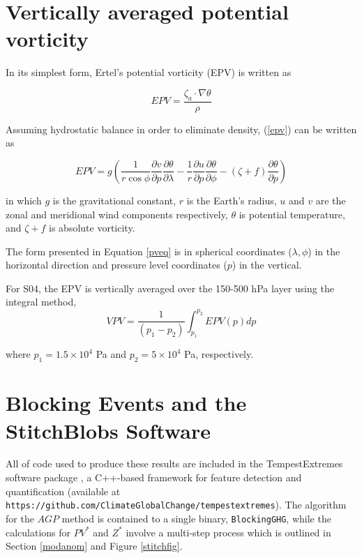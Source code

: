\documentclass[smallextended]{svjour3}       %
\numberwithin{equation}{section}
\begin{document}
\begin{appendices}

\section{Vertically averaged potential vorticity}\label{vpveq}

In its simplest form, Ertel's potential vorticity (EPV) is written as

\begin{equation}
EPV = \frac{\zeta_a\cdot \nabla \theta}{\rho}\label{epv}
\end{equation}

\noindent
Assuming hydrostatic balance in order to eliminate density, (\ref{epv}) can be written as 

\begin{equation}
  EPV=g\left(\frac{1}{r\cos\phi}\frac{\partial v}{\partial p}\frac{\partial \theta}{\partial \lambda}-\frac{1}{r}\frac{\partial u}{\partial p}\frac{\partial \theta}{\partial \phi}-(\zeta+f)\frac{\partial \theta}{\partial p}\right)\label{pveq}
\end{equation}

\noindent
in which $g$ is the gravitational constant, $r$ is the Earth's radius, $u$ and $v$ are the zonal and meridional wind components respectively, $\theta$ is potential temperature, and $\zeta + f$ is absolute vorticity.


The form presented in Equation \ref{pveq} is in spherical coordinates ($\lambda, \phi$) in the horizontal direction and pressure level coordinates ($p$) in the vertical. 


For S04, the EPV is vertically averaged over the 150-500 hPa layer using the integral method, 
\begin{equation}VPV=\frac{1}{(p_1-p_2)}\int_{p_1}^{p_2} EPV(p) dp\end{equation}

\noindent
where $p_1=1.5\times 10^4$ Pa and $p_2=5\times 10^4$ Pa, respectively.
\section{Blocking Events and the StitchBlobs Software}\label{stitchdesc}

All of code used to produce these results are included in the TempestExtremes software package \citep{ullrich_tempestextremes:_2017}, a C++-based framework for feature detection and quantification (available at \texttt{https://github.com/ClimateGlobalChange/tempestextremes}). The algorithm for the $AGP$ method is contained to a single binary, \texttt{BlockingGHG}, while the calculations for $PV^*$ and $Z^*$ involve a multi-step process which is outlined in Section \ref{modanom} and Figure \ref{stitchfig}. 



\end{appendices}
\end{document}
